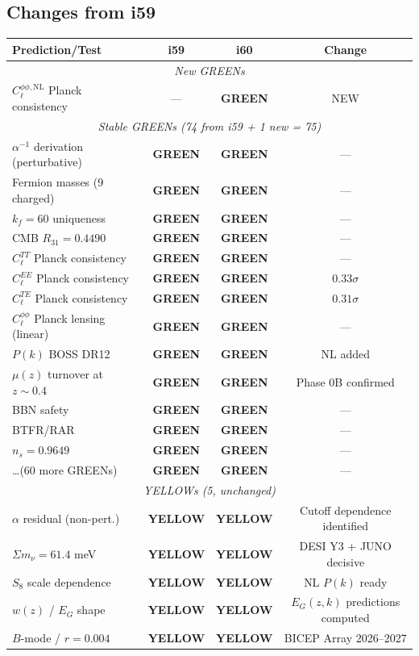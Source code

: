 \documentclass[11pt,a4paper]{article}
\newcommand{\GREEN}{\textcolor{dfdgreen}{\textbf{GREEN}}}
\newcommand{\YELLOW}{\textcolor{dfdyellow}{\textbf{YELLOW}}}
\begin{document}
\subsection{Changes from i59}

\begin{center}
\begin{longtable}{p{5cm}ccc}
\toprule
\textbf{Prediction/Test} & \textbf{i59} & \textbf{i60} & \textbf{Change} \\
\midrule
\multicolumn{4}{c}{\textit{New GREENs}} \\
\midrule
$C_\ell^{\phi\phi,\mathrm{NL}}$ Planck consistency & --- & \GREEN & NEW \\
\midrule
\multicolumn{4}{c}{\textit{Stable GREENs (74 from i59 + 1 new = 75)}} \\
\midrule
$\alpha^{-1}$ derivation (perturbative) & \GREEN & \GREEN & --- \\
Fermion masses (9 charged) & \GREEN & \GREEN & --- \\
$k_f = 60$ uniqueness & \GREEN & \GREEN & --- \\
CMB $R_{31} = 0.4490$ & \GREEN & \GREEN & --- \\
$C_\ell^{TT}$ Planck consistency & \GREEN & \GREEN & --- \\
$C_\ell^{EE}$ Planck consistency & \GREEN & \GREEN & $0.33\sigma$ \\
$C_\ell^{TE}$ Planck consistency & \GREEN & \GREEN & $0.31\sigma$ \\
$C_\ell^{\phi\phi}$ Planck lensing (linear) & \GREEN & \GREEN & --- \\
$P(k)$ BOSS DR12 & \GREEN & \GREEN & NL added \\
$\mu(z)$ turnover at $z \sim 0.4$ & \GREEN & \GREEN & Phase 0B confirmed \\
BBN safety & \GREEN & \GREEN & --- \\
BTFR/RAR & \GREEN & \GREEN & --- \\
$n_s = 0.9649$ & \GREEN & \GREEN & --- \\
\ldots (60 more GREENs) & \GREEN & \GREEN & --- \\
\midrule
\multicolumn{4}{c}{\textit{YELLOWs (5, unchanged)}} \\
\midrule
$\alpha$ residual (non-pert.) & \YELLOW & \YELLOW & Cutoff dependence identified \\
$\Sigma m_\nu = 61.4$ meV & \YELLOW & \YELLOW & DESI Y3 + JUNO decisive \\
$S_8$ scale dependence & \YELLOW & \YELLOW & NL $P(k)$ ready \\
$w(z)$ / $E_G$ shape & \YELLOW & \YELLOW & $E_G(z,k)$ predictions computed \\
$B$-mode / $r = 0.004$ & \YELLOW & \YELLOW & BICEP Array 2026--2027 \\
\bottomrule
\end{longtable}
\end{center}
\end{document}

